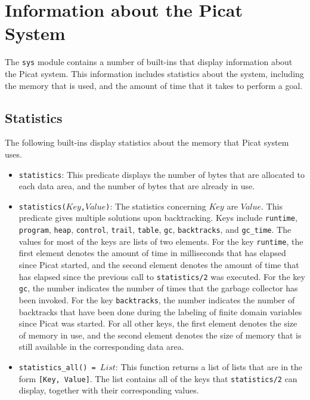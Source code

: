 \section{Information about the Picat System}
The \texttt{sys} module contains a number of built-ins that display information about the Picat system.  This information includes statistics about the system, including the memory that is used, and the amount of time that it takes to perform a goal.

\subsection{Statistics}
The following built-ins display statistics about the memory that Picat system uses.
\begin{itemize}
\item \texttt{statistics}: This predicate displays the number of bytes that are allocated to each data area, and the number of bytes that are already in use.
\item \texttt{statistics($Key$,$Value$)}: The statistics concerning $Key$ are $Value$.  This predicate gives multiple solutions upon backtracking.  Keys include \texttt{runtime}, \texttt{program}, \texttt{heap}, \texttt{control}, \texttt{trail}, \texttt{table}, \texttt{gc}, \texttt{backtracks}, and \texttt{gc\_time}.  The values for most of the keys are lists of two elements.  For the key \texttt{runtime}, the first element denotes the amount of time in milliseconds that has elapsed since Picat started, and the second element denotes the amount of time that has elapsed since the previous call to \texttt{statistics/2} was executed.  For the key \texttt{gc}, the number indicates the number of times that the garbage collector has been invoked.  For the key \texttt{backtracks}, the number indicates the number of backtracks that have been done during the labeling of finite domain variables since Picat was started.  For all other keys, the first element denotes the size of memory in use, and the second element denotes the size of memory that is still available in the corresponding data area.
\item \texttt{statistics\_all() = $List$}: This function returns a list of lists that are in the form \texttt{[Key, Value]}.  The list contains all of the keys that \texttt{statistics/2} can display, together with their corresponding values.
\end{itemize} 

